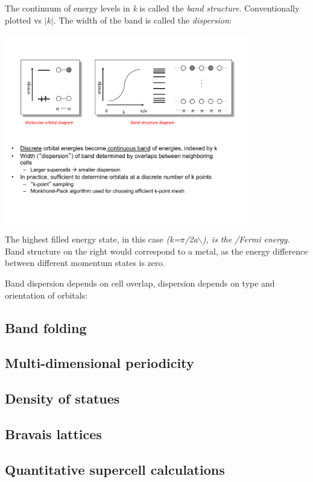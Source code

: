 \documentclass[11pt]{article}
\begin{document}
The continuum of energy levels in \emph{k} is called the \emph{band structure}. Conventionally plotted vs \(|k|\). The width of the band is called the \emph{dispersion}:
\begin{center}
\includegraphics[width=0.8\textwidth]{./Images/banddispersion.pdf}
\end{center}

The highest filled energy state, in this case \emph{(k=\(\pi\)/2a$\backslash$), is the /Fermi energy}. Band structure on the right would correspond to a metal, as the energy difference between different momentum states is zero.

Band dispersion depends on cell overlap, dispersion depends on type and orientation of orbitals:

\subsection{Band folding}
\label{sec:orgdd7886e}

\subsection{Multi-dimensional periodicity}
\label{sec:orgd0850e9}

\subsection{Density of statues}
\label{sec:org5a4d6d3}
\subsection{Bravais lattices}
\label{sec:orgbd36b20}
\subsection{Quantitative supercell calculations}
\label{sec:org4c485db}
\end{document}
